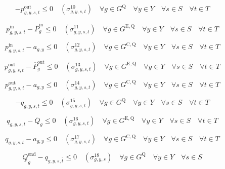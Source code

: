 \documentclass{article}
\newcommand{\sStorage}{G^{\mathrm{Q}}}
\newcommand{\sStorageExisting}{G^{\mathrm{E,Q}}}
\newcommand{\sStorageCandidate}{G^{\mathrm{C,Q}}}
\newcommand{\sYears}{Y}
\newcommand{\sScenarios}{S}
\newcommand{\sIntervals}{T}
\newcommand{\iGenerator}{g}
\newcommand{\iYear}{y}
\newcommand{\iScenario}{s}
\newcommand{\iInterval}{t}
\newcommand{\iIntervalTerminal}{\overline{\iInterval}}
\newcommand{\cPowerChargingMax}[1][\iGenerator]{\overline{P}^{\mathrm{in}}_{#1}}
\newcommand{\cPowerDischargingMax}[1][\iGenerator]{\overline{P}^{\mathrm{out}}_{#1}}
\newcommand{\cStorageUnitEnergyMax}[1][\iGenerator]{\overline{Q}_{#1}}
\newcommand{\cStorageUnitEnergyIntervalEndMin}[1][\iGenerator]{\underline{Q}^{\mathrm{end}}_{#1}}
\newcommand{\vPowerIn}[1][\iGenerator,\iYear,\iScenario,\iInterval]{p^{\mathrm{in}}_{#1}}
\newcommand{\vPowerOut}[1][\iGenerator,\iYear,\iScenario,\iInterval]{p^{\mathrm{out}}_{#1}}
\newcommand{\vStorageUnitEnergy}[1][\iGenerator,\iYear,\iScenario,\iInterval]{q_{#1}}
\newcommand{\vInstalledCapacityTotal}[1][\iGenerator,\iYear]{a_{#1}}
\newcommand{\dNonNegativeDischarging}[1][\iGenerator,\iYear,\iScenario,\iInterval]{\sigma_{#1}^{10}}
\newcommand{\dMaxChargingRateExisting}[1][\iGenerator,\iYear,\iScenario,\iInterval]{\sigma_{#1}^{11}}
\newcommand{\dMaxChargingRateCandidate}[1][\iGenerator,\iYear,\iScenario,\iInterval]{\sigma_{#1}^{12}}
\newcommand{\dMaxDischargingRateExisting}[1][\iGenerator,\iYear,\iScenario,\iInterval]{\sigma_{#1}^{13}}
\newcommand{\dMaxDischargingRateCandidate}[1][\iGenerator,\iYear,\iScenario,\iInterval]{\sigma_{#1}^{14}}
\newcommand{\dNonNegativeStorageEnergy}[1][\iGenerator,\iYear,\iScenario,\iInterval]{\sigma_{#1}^{15}}
\newcommand{\dMaxStorageEnergyExisting}[1][\iGenerator,\iYear,\iScenario,\iInterval]{\sigma_{#1}^{16}}
\newcommand{\dMaxStorageEnergyCandidate}[1][\iGenerator,\iYear,\iScenario,\iInterval]{\sigma_{#1}^{17}}
\newcommand{\dMinStorageEnergyIntervalEnd}[1][\iGenerator,\iYear,\iScenario]{\sigma_{#1}^{18}}
\newcommand{\sScenarioSets}{\quad \forall \iYear \in \sYears \quad \forall \iScenario \in \sScenarios \quad \forall \iInterval \in \sIntervals}
\begin{document}
\begin{equation}
	-\vPowerOut \leq 0 \quad (\dNonNegativeDischarging) \quad \forall \iGenerator \in \sStorage \sScenarioSets
\end{equation}

\begin{equation}
	\vPowerIn - \cPowerChargingMax \leq 0 \quad (\dMaxChargingRateExisting) \quad \forall \iGenerator \in \sStorageExisting \sScenarioSets
\end{equation}

\begin{equation}
	\vPowerIn - \vInstalledCapacityTotal \leq 0 \quad (\dMaxChargingRateCandidate) \quad \forall \iGenerator \in \sStorageCandidate \sScenarioSets
\end{equation}

\begin{equation}
	\vPowerOut - \cPowerDischargingMax \leq 0 \quad (\dMaxDischargingRateExisting) \quad \forall \iGenerator \in \sStorageExisting \sScenarioSets
\end{equation}

\begin{equation}
	\vPowerOut - \vInstalledCapacityTotal \leq 0 \quad (\dMaxDischargingRateCandidate) \quad \forall \iGenerator \in \sStorageCandidate \sScenarioSets
\end{equation}

\begin{equation}
	- \vStorageUnitEnergy \leq 0 \quad (\dNonNegativeStorageEnergy) \quad \forall \iGenerator \in \sStorage \sScenarioSets
\end{equation}

\begin{equation}
	\vStorageUnitEnergy - \cStorageUnitEnergyMax \leq 0 \quad (\dMaxStorageEnergyExisting) \quad \forall \iGenerator \in \sStorageExisting \sScenarioSets
\end{equation}

\begin{equation}
	\vStorageUnitEnergy - \vInstalledCapacityTotal \leq 0 \quad (\dMaxStorageEnergyCandidate) \quad \forall \iGenerator \in \sStorageCandidate \sScenarioSets
\end{equation}

\begin{equation}
	\cStorageUnitEnergyIntervalEndMin - \vStorageUnitEnergy[\iGenerator,\iYear,\iScenario,\iIntervalTerminal]\leq  0 \quad (\dMinStorageEnergyIntervalEnd) \quad \forall \iGenerator \in \sStorage \quad \forall \iYear \in \sYears \quad \forall \iScenario \in \sScenarios
\end{equation}
\end{document}
